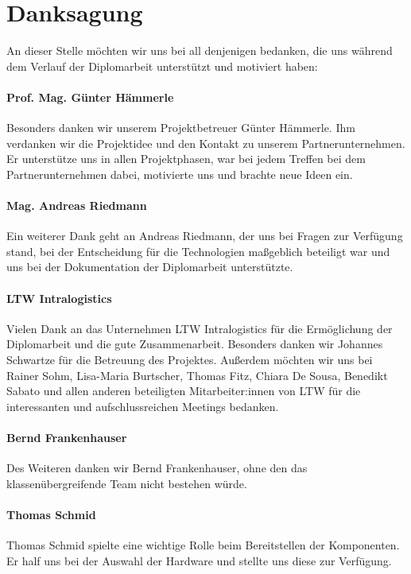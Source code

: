\section*{Danksagung}

An dieser Stelle möchten wir uns bei all denjenigen bedanken, die uns während dem Verlauf der Diplomarbeit unterstützt und motiviert haben:

\bigskip

\paragraph*{Prof. Mag. Günter Hämmerle}
Besonders danken wir unserem Projektbetreuer Günter Hämmerle. Ihm verdanken wir die Projektidee und den Kontakt zu unserem Partnerunternehmen. Er unterstütze uns in allen Projektphasen, war bei jedem Treffen bei dem Partnerunternehmen dabei, motivierte uns und brachte neue Ideen ein.

\paragraph*{Mag. Andreas Riedmann}
Ein weiterer Dank geht an Andreas Riedmann, der uns bei Fragen zur Verfügung stand, bei der Entscheidung für die Technologien maßgeblich beteiligt war und uns bei der Dokumentation der Diplomarbeit unterstützte.

\paragraph*{LTW Intralogistics}
Vielen Dank an das Unternehmen LTW Intralogistics für die Ermöglichung der Diplomarbeit und die gute Zusammenarbeit. Besonders danken wir Johannes Schwartze für die Betreuung des Projektes. Außerdem möchten wir uns bei Rainer Sohm, Lisa-Maria Burtscher, Thomas Fitz, Chiara De Sousa, Benedikt Sabato und allen anderen beteiligten Mitarbeiter:innen von LTW für die interessanten und aufschlussreichen Meetings bedanken.

\paragraph*{Bernd Frankenhauser}
Des Weiteren danken wir Bernd Frankenhauser, ohne den das klassenübergreifende Team nicht bestehen würde.

\paragraph*{Thomas Schmid}
Thomas Schmid spielte eine wichtige Rolle beim Bereitstellen der Komponenten. Er half uns bei der Auswahl der Hardware und stellte uns diese zur Verfügung.

